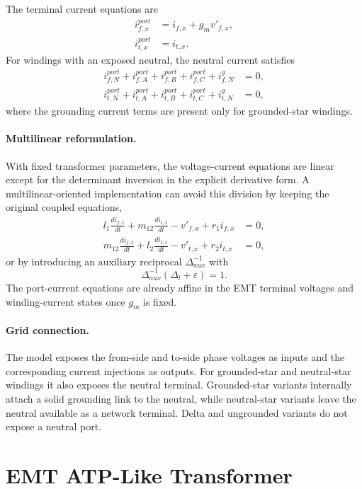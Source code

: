 The terminal current equations are
\begin{align}
    i^{port}_{f,x} &= i_{f,x}+g_m v'_{f,x}, \\
    i^{port}_{t,x} &= i_{t,x}.
\end{align}
For windings with an exposed neutral, the neutral current satisfies
\begin{align}
    i^{port}_{f,N}+i^{port}_{f,A}+i^{port}_{f,B}+i^{port}_{f,C}+i^{g}_{f,N} &= 0, \\
    i^{port}_{t,N}+i^{port}_{t,A}+i^{port}_{t,B}+i^{port}_{t,C}+i^{g}_{t,N} &= 0,
\end{align}
where the grounding current terms are present only for grounded-star windings.

\paragraph{Multilinear reformulation.}
With fixed transformer parameters, the voltage-current equations are linear except for the determinant inversion in the explicit derivative form. A multilinear-oriented implementation can avoid this division by keeping the original coupled equations,
\begin{align}
    l_1\frac{d i_{f,x}}{dt}+m_{12}\frac{d i_{t,x}}{dt} - v'_{f,x}+r_1i_{f,x} &= 0, \\
    m_{12}\frac{d i_{f,x}}{dt}+l_2\frac{d i_{t,x}}{dt} - v'_{t,x}+r_2i_{t,x} &= 0,
\end{align}
or by introducing an auxiliary reciprocal $\Delta^{-1}_{aux}$ with
\begin{equation}
    \Delta^{-1}_{aux}\left(\Delta_l+\varepsilon\right)=1.
\end{equation}
The port-current equations are already affine in the EMT terminal voltages and winding-current states once $g_m$ is fixed.

\paragraph{Grid connection.}
The model exposes the from-side and to-side phase voltages as inputs and the corresponding current injections as outputs. For grounded-star and neutral-star windings it also exposes the neutral terminal. Grounded-star variants internally attach a solid grounding link to the neutral, while neutral-star variants leave the neutral available as a network terminal. Delta and ungrounded variants do not expose a neutral port.

\section{EMT ATP-Like Transformer}

